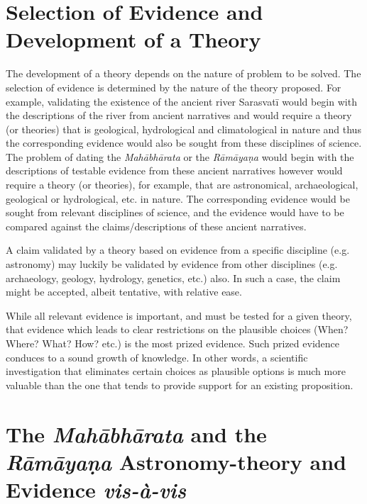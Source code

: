 \vspace{-.3cm}

\section*{Selection of Evidence and Development of a Theory}

The development of a theory depends on the nature of problem to be solved. The selection of evidence is determined by the nature of the theory proposed. For example, validating the existence of the ancient river Sarasvatī would begin with the descriptions of the river from ancient narratives and would require a theory (or theories) that is geological, hydrological and climatological in nature and thus the corresponding evidence would also be sought from these disciplines of science. The problem of dating the \textit{Mahābhārata} or the \textit{Rāmāyaṇa} would begin with the descriptions of testable evidence from these ancient narratives however would require a theory (or theories), for example, that are astronomical, archaeological, geological or hydrological, etc. in nature. The corresponding evidence would be sought from relevant disciplines of science, and the evidence would have to be compared against the claims/descriptions of these ancient narratives.

A claim validated by a theory based on evidence from a specific discipline (e.g. astronomy) may luckily be validated by evidence from other disciplines (e.g. archaeology, geology, hydrology, genetics, etc.) also. In such a case, the claim might be accepted, albeit tentative, with relative ease.

While all relevant evidence is important, and must be tested for a given theory, that evidence which leads to clear restrictions on the plausible choices (When? Where? What? How? etc.) is the most prized evidence. Such prized evidence conduces to a sound growth of knowledge. In other words, a scientific investigation that eliminates certain choices as plausible options is much more valuable than the one that tends to provide support for an existing proposition.

\vspace{-.3cm}

\section*{The \textit{Mahābhārata} and the \textit{Rāmāyaṇa} Astronomy-theory and Evidence \textit{vis-à-vis}}

